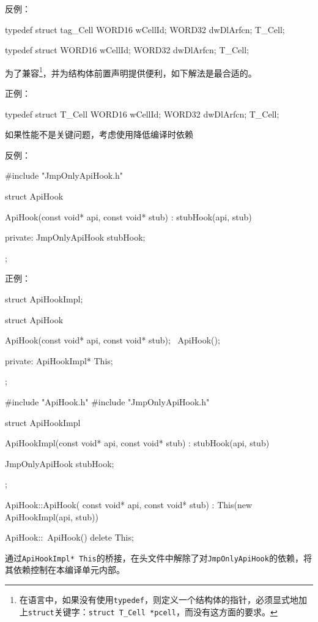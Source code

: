 \begin{content}
反例：
\begin{leftbar}
\begin{c++}
typedef struct tag_Cell
{
    WORD16 wCellId;
    WORD32 dwDlArfcn;
} T_Cell;

typedef struct
{
    WORD16 wCellId;
    WORD32 dwDlArfcn;
} T_Cell;
\end{c++}
\end{leftbar}

为了兼容\clang{}\footnote{在\clang{}语言中，如果没有使用\texttt{typedef}，则定义一个结构体的指针，必须显式地加上\texttt{struct}关键字：\texttt{struct T\_Cell *pcell}，而\cpp{}没有这方面的要求。}，并为结构体前置声明提供便利，如下解法是最合适的。

正例：
\begin{leftbar}
\begin{c++}
typedef struct T_Cell
{
    WORD16 wCellId;
    WORD32 dwDlArfcn;
} T_Cell;
\end{c++}
\end{leftbar}

\begin{advise}
如果性能不是关键问题，考虑使用降低编译时依赖
\end{advise}

反例：
\begin{leftbar}
\begin{c++}
#include "JmpOnlyApiHook.h"

struct ApiHook
{
    ApiHook(const void* api, const void* stub)
      : stubHook(api, stub)
    {}

private:
    JmpOnlyApiHook stubHook;
};
\end{c++}
\end{leftbar}

正例：
\begin{leftbar}
\begin{c++}
struct ApiHookImpl;

struct ApiHook
{
    ApiHook(const void* api, const void* stub);
    ~ApiHook();

private:
    ApiHookImpl* This;
};
\end{c++}
\end{leftbar}

\begin{leftbar}
\begin{c++}
#include "ApiHook.h"
#include "JmpOnlyApiHook.h"

struct ApiHookImpl
{
   ApiHookImpl(const void* api, const void* stub)
     : stubHook(api, stub)
   {
   }

   JmpOnlyApiHook stubHook;
};

ApiHook::ApiHook( const void* api, const void* stub)
  : This(new ApiHookImpl(api, stub))
{
}

ApiHook::~ApiHook()
{
    delete This;
}
\end{c++}
\end{leftbar}

通过\texttt{ApiHookImpl* This}的桥接，在头文件中解除了对\texttt{JmpOnlyApiHook}的依赖，将其依赖控制在本编译单元内部。

\end{content}


